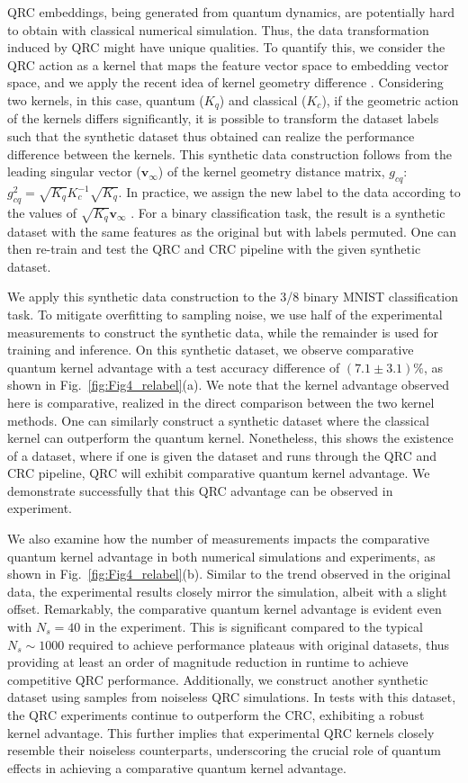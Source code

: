 \documentclass[english,floatfix,twocolumn,showpacs, aps, prx, reprint, superscriptaddress, longbibliography]{revtex4-2}
\begin{document}
QRC embeddings, being generated from quantum dynamics, are potentially hard to obtain with classical numerical simulation. Thus, the data transformation induced by QRC might have unique qualities. To quantify this, we consider the QRC action as a kernel that maps the feature vector space to embedding vector space, and we apply the recent idea of kernel geometry difference \cite{Huang2021}. Considering two kernels, in this case, quantum ($K_q$) and classical ($K_c$), if the geometric action of the kernels differs significantly, it is possible to transform the dataset labels such that the synthetic dataset thus obtained can realize the performance difference between the kernels. This synthetic data construction follows from the leading singular vector ($\mathbf{v}_{\infty}$) of the kernel geometry distance matrix, $g_{cq}$:    $g_{cq}^2=\sqrt{K_q}K_c^{-1}\sqrt{K_q}$. In practice, we assign the new label to the data according to the values of $\sqrt{K_q}\mathbf{v}_{\infty}$ \cite{Huang2021}. For a binary classification task, the result is a synthetic dataset with the same features as the original but with labels permuted. One can then re-train and test the QRC and CRC pipeline with the given synthetic dataset.

We apply this synthetic data construction to the 3/8 binary MNIST classification task. To mitigate overfitting to sampling noise, we use half of the experimental measurements to construct the synthetic data, while the remainder is used for training and inference. On this synthetic dataset, we observe comparative quantum kernel advantage with a test accuracy difference of $(7.1 \pm 3.1) \%$, as shown in Fig.~\ref{fig:Fig4_relabel}(a). We note that the kernel advantage observed here is comparative, realized in the direct comparison between the two kernel methods. One can similarly construct a synthetic dataset where the classical kernel can outperform the quantum kernel. Nonetheless, this shows the existence of a dataset, where if one is given the dataset and runs through the QRC and CRC pipeline, QRC will exhibit comparative quantum kernel advantage. We demonstrate successfully that this QRC advantage can be observed in experiment.

We also examine how the number of measurements impacts the comparative quantum kernel advantage in both numerical simulations and experiments, as shown in Fig.~\ref{fig:Fig4_relabel}(b). Similar to the trend observed in the original data, the experimental results closely mirror the simulation, albeit with a slight offset. Remarkably, the comparative quantum kernel advantage is evident even with $N_s=40$ in the experiment. This is significant compared to the typical $N_s \sim 1000$ required to achieve performance plateaus with original datasets, thus providing at least an order of magnitude reduction in runtime to achieve competitive QRC performance. Additionally, we construct another synthetic dataset using samples from noiseless QRC simulations. In tests with this dataset, the QRC experiments continue to outperform the CRC, exhibiting a robust kernel advantage. This further implies that experimental QRC kernels closely resemble their noiseless counterparts, underscoring the crucial role of quantum effects in achieving a comparative quantum kernel advantage.
\end{document}
